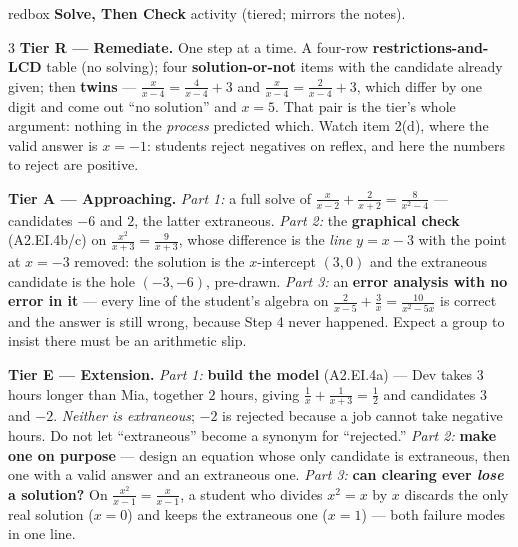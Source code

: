 \documentclass[10pt]{article}
\begin{document}
\begin{skillbox}{redbox}
\textbf{Solve, Then Check} activity (tiered; mirrors the notes).
\begin{multicols}{3}
\textbf{Tier R --- Remediate.} One step at a time. A four-row \textbf{restrictions-and-LCD} table (no
solving); four \textbf{solution-or-not} items with the candidate already given; then \textbf{twins} ---
$\frac{x}{x-4}=\frac{4}{x-4}+3$ and $\frac{x}{x-4}=\frac{2}{x-4}+3$, which differ by one digit and come
out ``no solution'' and $x=5$. That pair is the tier's whole argument: nothing in the \emph{process}
predicted which. Watch item 2(d), where the valid answer is $x=-1$: students reject negatives on
reflex, and here the numbers to reject are positive.

\columnbreak
\textbf{Tier A --- Approaching.} \emph{Part 1:} a full solve of
$\frac{x}{x-2}+\frac{2}{x+2}=\frac{8}{x^2-4}$ --- candidates $-6$ and $2$, the latter extraneous.
\emph{Part 2:} the \textbf{graphical check} (A2.EI.4b/c) on $\frac{x^2}{x+3}=\frac{9}{x+3}$, whose
difference is the \emph{line} $y=x-3$ with the point at $x=-3$ removed: the solution is the
$x$-intercept $(3,0)$ and the extraneous candidate is the hole $(-3,-6)$, pre-drawn. \emph{Part 3:} an
\textbf{error analysis with no error in it} --- every line of the student's algebra on
$\frac{2}{x-5}+\frac{3}{x}=\frac{10}{x^2-5x}$ is correct and the answer is still wrong, because Step 4
never happened. Expect a group to insist there must be an arithmetic slip.

\columnbreak
\textbf{Tier E --- Extension.} \emph{Part 1:} \textbf{build the model} (A2.EI.4a) --- Dev takes $3$
hours longer than Mia, together $2$ hours, giving $\frac1x+\frac{1}{x+3}=\frac12$ and candidates $3$ and
$-2$. \emph{Neither is extraneous}; $-2$ is rejected because a job cannot take negative hours. Do not
let ``extraneous'' become a synonym for ``rejected.'' \emph{Part 2:} \textbf{make one on purpose} ---
design an equation whose only candidate is extraneous, then one with a valid answer and an extraneous
one. \emph{Part 3:} \textbf{can clearing ever \emph{lose} a solution?} On
$\frac{x^2}{x-1}=\frac{x}{x-1}$, a student who divides $x^2=x$ by $x$ discards the only real solution
($x=0$) and keeps the extraneous one ($x=1$) --- both failure modes in one line.
\end{multicols}
\end{skillbox}
\end{document}
